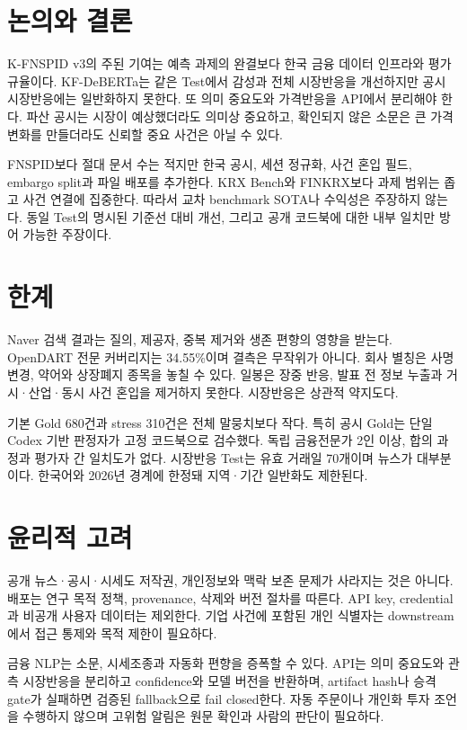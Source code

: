 \documentclass[10pt,a4paper,twocolumn]{article}
\newcommand{\dataset}{K-FNSPID v3}
\begin{document}
\section{논의와 결론}

\dataset{}의 주된 기여는 예측 과제의 완결보다 한국 금융 데이터 인프라와 평가 규율이다. KF-DeBERTa는 같은 Test에서 감성과 전체 시장반응을 개선하지만 공시 시장반응에는 일반화하지 못한다. 또 의미 중요도와 가격반응을 API에서 분리해야 한다. 파산 공시는 시장이 예상했더라도 의미상 중요하고, 확인되지 않은 소문은 큰 가격변화를 만들더라도 신뢰할 중요 사건은 아닐 수 있다.

FNSPID보다 절대 문서 수는 적지만 한국 공시, 세션 정규화, 사건 혼입 필드, embargo split과 파일 배포를 추가한다. KRX Bench와 FINKRX보다 과제 범위는 좁고 사건 연결에 집중한다. 따라서 교차 benchmark SOTA나 수익성은 주장하지 않는다. 동일 Test의 명시된 기준선 대비 개선, 그리고 공개 코드북에 대한 내부 일치만 방어 가능한 주장이다.

\section*{한계}

Naver 검색 결과는 질의, 제공자, 중복 제거와 생존 편향의 영향을 받는다. OpenDART 전문 커버리지는 34.55\%이며 결측은 무작위가 아니다. 회사 별칭은 사명 변경, 약어와 상장폐지 종목을 놓칠 수 있다. 일봉은 장중 반응, 발표 전 정보 누출과 거시·산업·동시 사건 혼입을 제거하지 못한다. 시장반응은 상관적 약지도다.

기본 Gold 680건과 stress 310건은 전체 말뭉치보다 작다. 특히 공시 Gold는 단일 Codex 기반 판정자가 고정 코드북으로 검수했다. 독립 금융전문가 2인 이상, 합의 과정과 평가자 간 일치도가 없다. 시장반응 Test는 유효 거래일 70개이며 뉴스가 대부분이다. 한국어와 2026년 경계에 한정돼 지역·기간 일반화도 제한된다.

\section*{윤리적 고려}

공개 뉴스·공시·시세도 저작권, 개인정보와 맥락 보존 문제가 사라지는 것은 아니다. 배포는 연구 목적 정책, provenance, 삭제와 버전 절차를 따른다. API key, credential과 비공개 사용자 데이터는 제외한다. 기업 사건에 포함된 개인 식별자는 downstream에서 접근 통제와 목적 제한이 필요하다.

금융 NLP는 소문, 시세조종과 자동화 편향을 증폭할 수 있다. API는 의미 중요도와 관측 시장반응을 분리하고 confidence와 모델 버전을 반환하며, artifact hash나 승격 gate가 실패하면 검증된 fallback으로 fail closed한다. 자동 주문이나 개인화 투자 조언을 수행하지 않으며 고위험 알림은 원문 확인과 사람의 판단이 필요하다.
\end{document}
